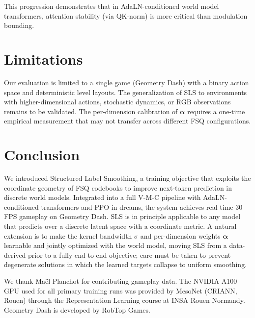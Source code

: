 \documentclass{article}
\begin{document}
This progression demonstrates that in AdaLN-conditioned world model transformers, attention stability (via QK-norm) is more critical than modulation bounding.

\section{Limitations}
\label{sec:limitations}

Our evaluation is limited to a single game (Geometry Dash) with a binary action space and deterministic level layouts.
The generalization of SLS to environments with higher-dimensional actions, stochastic dynamics, or RGB observations remains to be validated.
The per-dimension calibration of $\boldsymbol{\alpha}$ requires a one-time empirical measurement that may not transfer across different FSQ configurations.

\section{Conclusion}
\label{sec:conclusion}

We introduced Structured Label Smoothing, a training objective that exploits the coordinate geometry of FSQ codebooks to improve next-token prediction in discrete world models.
Integrated into a full V-M-C pipeline with AdaLN-conditioned transformers and PPO-in-dreams, the system achieves real-time 30\,FPS gameplay on Geometry Dash.
SLS is in principle applicable to any model that predicts over a discrete latent space with a coordinate metric.
A natural extension is to make the kernel bandwidth $\sigma$ and per-dimension weights $\boldsymbol{\alpha}$ learnable and jointly optimized with the world model, moving SLS from a data-derived prior to a fully end-to-end objective; care must be taken to prevent degenerate solutions in which the learned targets collapse to uniform smoothing.

\begin{ack}
  We thank Ma{\"e}l Planchot for contributing gameplay data.
  The NVIDIA A100 GPU used for all primary training runs was provided by MesoNet (CRIANN, Rouen) through the Representation Learning course at INSA Rouen Normandy.
  Geometry Dash is developed by RobTop Games.
\end{ack}





\appendix



\newpage

\end{document}

